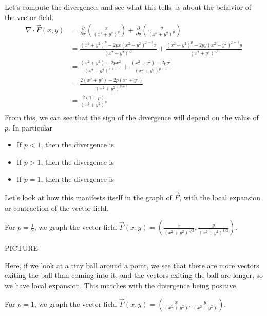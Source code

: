 \documentclass{ximera}
\begin{document}
Let's compute the divergence, and see what this tells us about the behavior of the vector field.
\begin{align*}
\nabla\cdot \vec{F}(x,y) &= \frac{\partial}{\partial x}\left(\frac{x}{(x^2+y^2)^p}\right) + \frac{\partial}{\partial y}\left(\frac{y}{(x^2+y^2)^p}\right) \\
&= \frac{(x^2+y^2)^p - 2px(x^2+y^2)^{p-1}x}{(x^2+y^2)^{2p}} + \frac{(x^2+y^2)^p - 2py(x^2+y^2)^{p-1}y}{(x^2+y^2)^{2p}}\\
&= \frac{(x^2+y^2) - 2px^2}{(x^2+y^2)^{p+1}} + \frac{(x^2+y^2) - 2py^2}{(x^2+y^2)^{p+1}}\\
&= \frac{2(x^2+y^2) - 2p(x^2+y^2)}{(x^2+y^2)^{p+1}}\\
&= \frac{2(1-p)}{(x^2+y^2)^p}\\
\end{align*}
From this, we can see that the sign of the divergence will depend on the value of $p$. In particular
\begin{itemize}
\item If $p<1$, then the divergence is
\begin{multipleChoice}
\end{multipleChoice}
\item If $p>1$, then the divergence is
\begin{multipleChoice}
\end{multipleChoice}
\item If $p=1$, then the divergence is
\begin{multipleChoice}
\end{multipleChoice}
\end{itemize}
Let's look at how this manifests itself in the graph of $\vec{F}$, with the local expansion or contraction of the vector field.

For $p=\frac{1}{2}$, we graph the vector field $\vec{F}(x,y) = \left(\frac{x}{(x^2+y^2)^{1/2}},\frac{y}{(x^2+y^2)^{1/2}} \right)$.

PICTURE

Here, if we look at a tiny ball around a point, we see that there are more vectors exiting the ball than coming into it, and the vectors exiting the ball are longer, so we have local expansion. This matches with the divergence being positive.

For $p = 1$, we graph the vector field $\vec{F}(x,y) = \left(\frac{x}{(x^2+y^2)},\frac{y}{(x^2+y^2)} \right)$.
\end{document}
